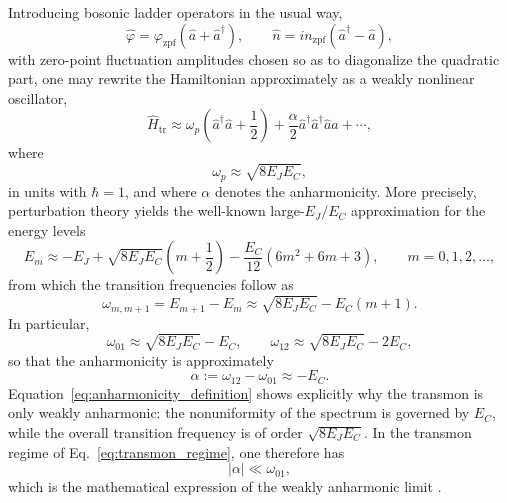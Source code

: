 Introducing bosonic ladder operators in the usual way,
\begin{equation}
\hat{\varphi} = \varphi_{\mathrm{zpf}}(\hat{a}+\hat{a}^{\dagger}),
\qquad
\hat{n} = i n_{\mathrm{zpf}}(\hat{a}^{\dagger}-\hat{a}),
\label{eq:zpf_operators}
\end{equation}
with zero-point fluctuation amplitudes chosen so as to diagonalize the quadratic part, one may rewrite the Hamiltonian approximately as a weakly nonlinear oscillator,
\begin{equation}
\hat{H}_{\mathrm{tr}}
\approx
\omega_p \left(\hat{a}^{\dagger}\hat{a}+\frac{1}{2}\right)
+
\frac{\alpha}{2}\hat{a}^{\dagger}\hat{a}^{\dagger}\hat{a}\hat{a}
+\cdots,
\label{eq:duffing_hamiltonian}
\end{equation}
where
\begin{equation}
\omega_p \approx \sqrt{8E_JE_C},
\label{eq:plasma_frequency}
\end{equation}
in units with $\hbar=1$, and where $\alpha$ denotes the anharmonicity. More precisely, perturbation theory yields the well-known large-$E_J/E_C$ approximation for the energy levels
\begin{equation}
E_m
\approx
- E_J
+
\sqrt{8E_JE_C}\left(m+\frac{1}{2}\right)
-
\frac{E_C}{12}\left(6m^2+6m+3\right),
\qquad
m=0,1,2,\dots,
\label{eq:transmon_energy_levels}
\end{equation}
from which the transition frequencies follow as
\begin{equation}
\omega_{m,m+1}
=
E_{m+1}-E_m
\approx
\sqrt{8E_JE_C} - E_C(m+1).
\label{eq:transition_frequencies}
\end{equation}
In particular,
\begin{equation}
\omega_{01}
\approx
\sqrt{8E_JE_C}-E_C,
\qquad
\omega_{12}
\approx
\sqrt{8E_JE_C}-2E_C,
\label{eq:first_two_transitions}
\end{equation}
so that the anharmonicity is approximately
\begin{equation}
\alpha
:=
\omega_{12}-\omega_{01}
\approx
- E_C.
\label{eq:anharmonicity_definition}
\end{equation}
Equation~\eqref{eq:anharmonicity_definition} shows explicitly why the transmon is only weakly anharmonic: the nonuniformity of the spectrum is governed by $E_C$, while the overall transition frequency is of order $\sqrt{8E_JE_C}$. In the transmon regime of Eq.~\eqref{eq:transmon_regime}, one therefore has
\begin{equation}
|\alpha| \ll \omega_{01},
\label{eq:weak_anharmonicity_condition}
\end{equation}
which is the mathematical expression of the weakly anharmonic limit \cite{Koch2007,Krantz2019}.

